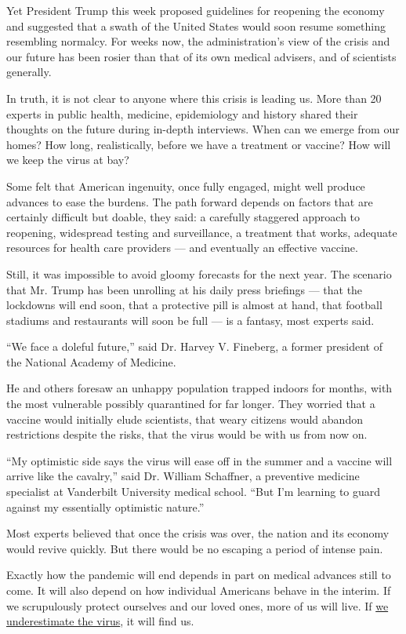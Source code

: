 Yet President Trump this week proposed guidelines for reopening the
economy and suggested that a swath of the United States would soon
resume something resembling normalcy. For weeks now, the
administration's view of the crisis and our future has been rosier than
that of its own medical advisers, and of scientists generally.

In truth, it is not clear to anyone where this crisis is leading us.
More than 20 experts in public health, medicine, epidemiology and
history shared their thoughts on the future during in-depth interviews.
When can we emerge from our homes? How long, realistically, before we
have a treatment or vaccine? How will we keep the virus at bay?

Some felt that American ingenuity, once fully engaged, might well
produce advances to ease the burdens. The path forward depends on
factors that are certainly difficult but doable, they said: a carefully
staggered approach to reopening, widespread testing and surveillance, a
treatment that works, adequate resources for health care providers ---
and eventually an effective vaccine.

Still, it was impossible to avoid gloomy forecasts for the next year.
The scenario that Mr. Trump has been unrolling at his daily press
briefings --- that the lockdowns will end soon, that a protective pill
is almost at hand, that football stadiums and restaurants will soon be
full --- is a fantasy, most experts said.

``We face a doleful future,'' said Dr. Harvey V. Fineberg, a former
president of the National Academy of Medicine.

He and others foresaw an unhappy population trapped indoors for months,
with the most vulnerable possibly quarantined for far longer. They
worried that a vaccine would initially elude scientists, that weary
citizens would abandon restrictions despite the risks, that the virus
would be with us from now on.

``My optimistic side says the virus will ease off in the summer and a
vaccine will arrive like the cavalry,'' said Dr. William Schaffner, a
preventive medicine specialist at Vanderbilt University medical school.
``But I'm learning to guard against my essentially optimistic nature.''

Most experts believed that once the crisis was over, the nation and its
economy would revive quickly. But there would be no escaping a period of
intense pain.

Exactly how the pandemic will end depends in part on medical advances
still to come. It will also depend on how individual Americans behave in
the interim. If we scrupulously protect ourselves and our loved ones,
more of us will live. If
\href{https://www.nytimes.com/2020/04/14/us/bishop-gerald-glenn-coronavirus.html}{we
underestimate the virus}, it will find us.

